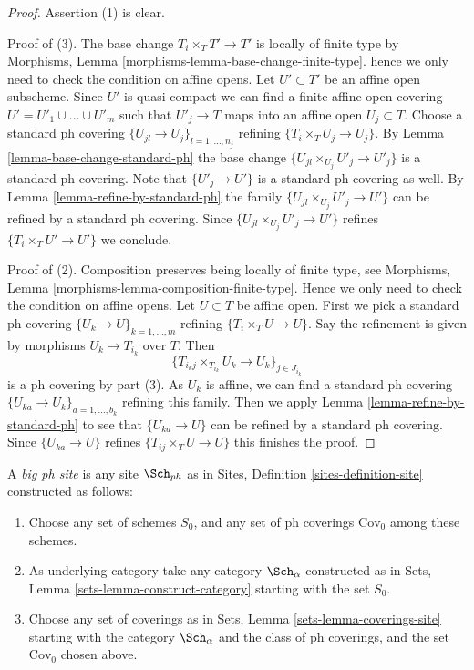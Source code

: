\begin{proof}
Assertion (1) is clear.

\medskip\noindent
Proof of (3). The base change $T_i \times_T T' \to T'$ is
locally of finite type by
Morphisms, Lemma \ref{morphisms-lemma-base-change-finite-type}.
hence we only need to check the condition on affine opens.
Let $U' \subset T'$ be an affine open subscheme.
Since $U'$ is quasi-compact we can find a finite affine open
covering $U' = U'_1 \cup \ldots \cup U'_m$ such that
$U'_j \to T$ maps into an affine open $U_j \subset T$.
Choose a standard ph covering $\{U_{jl} \to U_j\}_{l = 1, \ldots, n_j}$
refining $\{T_i \times_T U_j \to U_j\}$.
By Lemma \ref{lemma-base-change-standard-ph}
the base change $\{U_{jl} \times_{U_j} U'_j \to U'_j\}$
is a standard ph covering. Note that $\{U'_j \to U'\}$
is a standard ph covering as well.
By Lemma \ref{lemma-refine-by-standard-ph} 
the family $\{U_{jl} \times_{U_j} U'_j \to U'\}$
can be refined by a standard ph covering. Since
$\{U_{jl} \times_{U_j} U'_j \to U'\}$ refines $\{T_i \times_T U' \to U'\}$
we conclude.

\medskip\noindent
Proof of (2). Composition preserves being locally of finite type,
see Morphisms, Lemma \ref{morphisms-lemma-composition-finite-type}.
Hence we only need to check the condition on affine opens.
Let $U \subset T$ be affine open. First we pick a standard ph covering
$\{U_k \to U\}_{k = 1, \ldots, m}$ refining
$\{T_i \times_T U \to U\}$.
Say the refinement is given by morphisms $U_k \to T_{i_k}$ over $T$.
Then
$$
\{T_{i_kj} \times_{T_{i_k}} U_k \to U_k\}_{j \in J_{i_k}}
$$
is a ph covering by part (3). As $U_k$ is affine,
we can find a standard ph covering
$\{U_{ka} \to U_k\}_{a = 1, \ldots, b_k}$ refining this family.
Then we apply Lemma \ref{lemma-refine-by-standard-ph}
to see that $\{U_{ka} \to U\}$ can be refined by a
standard ph covering. Since $\{U_{ka} \to U\}$
refines $\{T_{ij} \times_T U \to U\}$ this finishes the proof.
\end{proof}

\begin{definition}
\label{definition-big-ph-site}
A {\it big ph site} is any site $\Sch_{ph}$ as in
Sites, Definition \ref{sites-definition-site} constructed as follows:
\begin{enumerate}
\item Choose any set of schemes $S_0$, and any set of ph coverings
$\text{Cov}_0$ among these schemes.
\item As underlying category take any category $\Sch_\alpha$
constructed as in Sets, Lemma \ref{sets-lemma-construct-category}
starting with the set $S_0$.
\item Choose any set of coverings as in
Sets, Lemma \ref{sets-lemma-coverings-site} starting with the
category $\Sch_\alpha$ and the class of ph coverings,
and the set $\text{Cov}_0$ chosen above.
\end{enumerate}
\end{definition}


